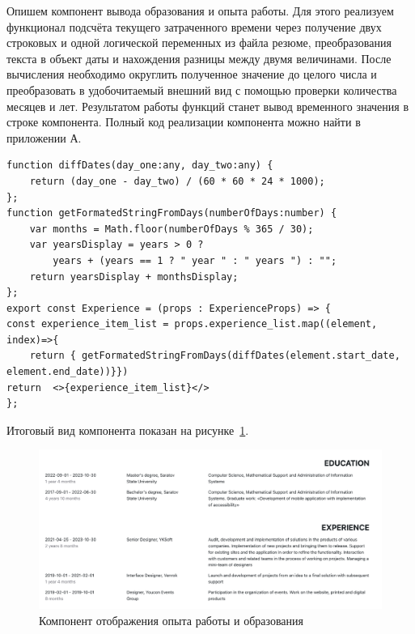 \documentclass[master, och, pract]{SCWorks}
\begin{document}
Опишем компонент вывода образования и опыта работы. Для этого реализуем функционал подсчёта текущего затраченного времени через получение двух строковых и одной логической переменных из файла резюме, преобразования текста в объект даты и нахождения разницы между двумя величинами. После вычисления необходимо округлить полученное значение до целого числа и преобразовать в удобочитаемый внешний вид с помощью проверки количества месяцев и лет. Результатом работы функций станет вывод временного значения в строке компонента. Полный код реализации компонента можно найти в приложении А.
\begin{verbatim}
function diffDates(day_one:any, day_two:any) {
    return (day_one - day_two) / (60 * 60 * 24 * 1000);
};
function getFormatedStringFromDays(numberOfDays:number) {
    var months = Math.floor(numberOfDays % 365 / 30);
    var yearsDisplay = years > 0 ? 
        years + (years == 1 ? " year " : " years ") : "";
    return yearsDisplay + monthsDisplay; 
};
export const Experience = (props : ExperienceProps) => {
const experience_item_list = props.experience_list.map((element, index)=>{
    return { getFormatedStringFromDays(diffDates(element.start_date, element.end_date))}})
return  <>{experience_item_list}</>
};
\end{verbatim}

Итоговый вид компонента показан на рисунке~\ref{fig:3}.  
\begin{figure}[!ht]
    \centering
    \includegraphics[width=12cm]{images/image-resume-2.png}
    \caption{\label{fig:3}%
        Компонент отображения опыта работы и образования}
\end{figure}
\end{document}
